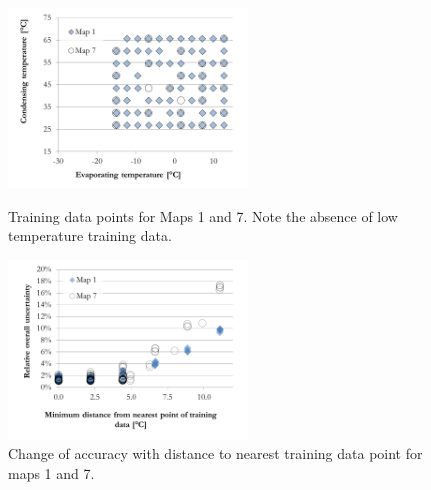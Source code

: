 \begin{figure}[h]
\begin{minipage}{15pc}
\includegraphics[width=15pc]{./fig/Map_1_and_7_training_data.pdf}
\caption{\label{fig:map_1_7_training_data}Training data points for Maps 1 and 7. Note the absence of low temperature training data.}
\end{minipage}\hspace{2pc}%
\begin{minipage}{15pc}
\includegraphics[width=15pc]{./fig/Map_1_and_7_C_distance.pdf}
\caption{\label{fig:map_1_7_unc_C_distance}Change of accuracy with distance to nearest training data point for maps 1 and 7.}
\end{minipage} 
\end{figure}


